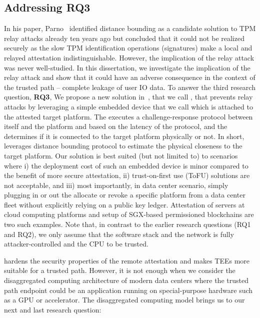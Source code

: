     \subsection{Addressing RQ3}

In his paper, Parno~\cite{parno2008bootstrapping} identified distance bounding as a candidate solution to TPM relay attacks already ten years ago but concluded that it could not be realized securely as the slow TPM identification operations (signatures) make a local and relayed attestation indistinguishable. However, the implication of the relay attack was never well-studied. In this dissertation, we investigate the implication of the relay attack and show that it could have an adverse consequence in the context of the trusted path -- complete leakage of user IO data. To answer the third research question, \textbf{RQ3},  We propose a new solution in~, that we call \proximitee, that prevents relay attacks by leveraging a simple embedded device that we call \deviceproximitee which is attached to the attested target platform. The \deviceproximitee executes a challenge-response protocol between itself and the platform and based on the latency of the protocol, and the \deviceproximitee determines if it is connected to the target platform physically or not. In short, \deviceproximitee leverages distance bounding protocol to estimate the physical closeness to the target platform. Our solution is best suited (but not limited to) to scenarios where i) the deployment cost of such an embedded device is minor compared to the benefit of more secure attestation, ii) trust-on-first use (ToFU) solutions are not acceptable, and iii) most importantly, in data center scenario, simply plugging in or out the \deviceproximitee allocate or revoke a specific platform from a data center fleet without explicitly relying on a public key ledger. Attestation of servers at cloud computing platforms and setup of SGX-based permissioned blockchains are two such examples. Note that, in contrast to the earlier research questions (RQ1 and RQ2), we only assume that the software stack and the network is fully attacker-controlled and the CPU to be trusted.



\proximitee hardens the security properties of the remote attestation and makes TEEs more suitable for a trusted path. However, it is not enough when we consider the disaggregated computing architecture of modern data centers where the trusted path endpoint could be an application running on special-purpose hardware such as a GPU or accelerator. The disaggregated computing model brings us to our next and last research question:  
    
